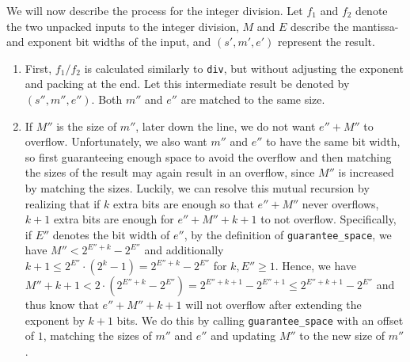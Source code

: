 \documentclass[a4paper,UKenglish,cleveref, autoref, thm-restate]{lipics-v2019}
\begin{document}
We will now describe the process for the integer division. Let $f_1$ and $f_2$ denote the two unpacked inputs to the integer division, $M$ and $E$ describe the mantissa- and exponent bit widths of the input, and $(s', m', e')$ represent the result.
\begin{enumerate}
	\item First, $f_1 / f_2$ is calculated similarly to \verb|div|, but without adjusting the exponent and packing at the end. Let this intermediate result be denoted by $(s'', m'', e'')$. Both $m''$ and $e''$ are matched to the same size. 
	\item If $M''$ is the size of $m''$, later down the line, we do not want $e'' + M''$ to overflow. Unfortunately, we also want $m''$ and $e''$ to have the same bit width, so first guaranteeing enough space to avoid the overflow and then matching the sizes of the result may again result in an overflow, since $M''$ is increased by matching the sizes. Luckily, we can resolve this mutual recursion by realizing that if $k$ extra bits are enough so that $e'' + M''$ never overflows, $k + 1$ extra bits are enough for $e'' + M'' + k + 1$ to not overflow. Specifically, if $E''$ denotes the bit width of $e''$, by the definition of \verb|guarantee_space|, we have $M'' < 2^{E''+k} - 2^{E''}$ and additionally $k + 1 \leq 2^{E''} \cdot (2^k - 1) = 2^{E'' + k} - 2^{E''}$ for $k, E'' \geq 1$. Hence, we have $M'' + k + 1 < 2 \cdot (2^{E'' + k} - 2^{E''}) = 2^{E'' + k + 1} - 2^{E'' + 1} \leq 2^{E'' + k + 1} - 2^{E''}$ and thus know that $e'' + M'' + k + 1$ will not overflow after extending the exponent by $k+1$ bits. We do this by calling \verb|guarantee_space| with an offset of $1$, matching the sizes of $m''$ and $e''$ and updating $M''$ to the new size of $m''$. 

\end{enumerate}
\end{document}
